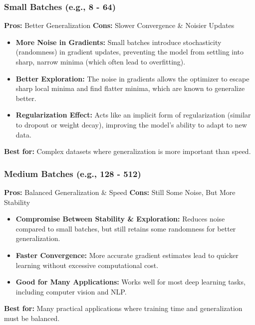 \documentclass{article}
\begin{document}
\subsubsection{Small Batches (e.g., 8 - 64)}
\textbf{Pros:} Better Generalization\newline
\textbf{Cons:} Slower Convergence \& Noisier Updates\newline
\begin{itemize}
    \item \textbf{More Noise in Gradients:} Small batches introduce stochasticity (randomness) in gradient updates, preventing the model from settling into sharp, narrow minima (which often lead to overfitting).
    \item \textbf{Better Exploration:} The noise in gradients allows the optimizer to escape sharp local minima and find flatter minima, which are known to generalize better.
    \item \textbf{Regularization Effect:} Acts like an implicit form of regularization (similar to dropout or weight decay), improving the model’s ability to adapt to new data.
\end{itemize}
\textbf{Best for:} Complex datasets where generalization is more important than speed.

\subsubsection{Medium Batches (e.g., 128 - 512)}
\textbf{Pros:} Balanced Generalization \& Speed\newline
\textbf{Cons:} Still Some Noise, But More Stability\newline
\begin{itemize}
    \item \textbf{Compromise Between Stability \& Exploration:} Reduces noise compared to small batches, but still retains some randomness for better generalization.
    \item \textbf{Faster Convergence:} More accurate gradient estimates lead to quicker learning without excessive computational cost.
    \item \textbf{Good for Many Applications:} Works well for most deep learning tasks, including computer vision and NLP.
\end{itemize}
\textbf{Best for:} Many practical applications where training time and generalization must be balanced.
\end{document}
